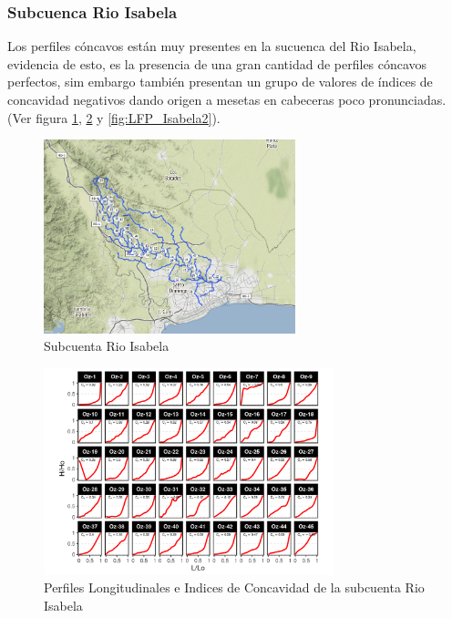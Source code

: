 \documentclass[11pt,]{article}
\begin{document}
\subsubsection{Subcuenca Rio Isabela}\label{subcuenca-rio-isabela}

Los perfiles cóncavos están muy presentes en la sucuenca del Rio
Isabela, evidencia de esto, es la presencia de una gran cantidad de
perfiles cóncavos perfectos, sim embargo también presentan un grupo de
valores de índices de concavidad negativos dando origen a mesetas en
cabeceras poco pronunciadas.(Ver figura \ref{fig:LFP_Isabela0},
\ref{fig:LFP_Isabela1} y \ref{fig:LFP_Isabela2}).

\begin{figure}
\centering
\includegraphics[width=0.65000\textwidth]{Productos Generados/p_isabela.png}
\caption{\label{fig:LFP_Isabela0} Subcuenta Rio Isabela}
\end{figure}

\begin{figure}
\centering
\includegraphics[width=0.75000\textwidth]{Productos Generados/p_c_isabela1.png}
\caption{\label{fig:LFP_Isabela1} Perfiles Longitudinales e Indices de
Concavidad de la subcuenta Rio Isabela}
\end{figure}
\end{document}
